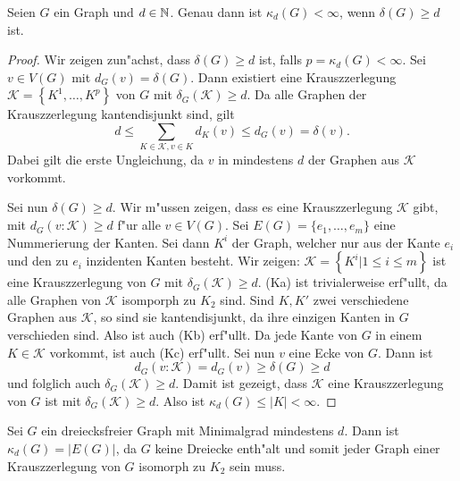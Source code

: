 \begin{lemma}
  Seien $G$ ein Graph und $d\in {\mathbb{N}}$. Genau dann ist $\kappa_{d}(G) < \infty$, wenn $\delta(G) \geq d$ ist. \label{lm:krauszexistenz}
\end{lemma}
\begin{proof}
  Wir zeigen zun"achst, dass $\delta(G) \geq d$ ist, falls $p = \kappa_d(G) < \infty$. Sei $v\in V(G)$ mit $d_{G}(v) = \delta(G)$. Dann existiert eine Krauszzerlegung $\mathcal{K}=\left\{ K^{1}, \dots , K^{p} \right\}$ von $G$ mit $\delta_{G}(\mathcal{K}) \geq d$. Da alle Graphen der Krauszzerlegung kantendisjunkt sind, gilt $$ d \leq \sum\limits_{K\in \mathcal{K}, v\in K} d_{K}(v) \leq d_{G}(v) = \delta(v).$$
  Dabei gilt die erste Ungleichung, da $v$ in mindestens $d$ der Graphen aus $\mathcal{K}$ vorkommt.

  Sei nun $\delta(G) \geq d$. Wir m"ussen zeigen, dass es eine Krauszzerlegung $\mathcal{K}$ gibt, mit
  $d_{G}(v:\mathcal{K}) \geq d$ f"ur alle $v\in V(G)$. Sei $E(G)= \{e_1,\dots, e_{m}\}$ eine Nummerierung der Kanten. Sei dann $K^i$ der Graph, welcher nur aus der Kante $e_i$ und den zu $e_i$ inzidenten Kanten besteht. Wir zeigen: $\mathcal{K} = \left\{ K^i | 1 \leq i \leq m \right\}$ ist eine Krauszzerlegung von $G$ mit $\delta_{G}(\mathcal{K}) \geq d$. (Ka) ist trivialerweise erf"ullt, da alle Graphen von $\mathcal{K}$ isomporph zu $K_{2}$ sind. Sind $K,K'$ zwei verschiedene Graphen aus $\mathcal{K}$, so sind sie
  kantendisjunkt, da ihre einzigen Kanten in $G$ verschieden sind. Also ist auch (Kb) erf"ullt. Da jede Kante von $G$ in einem $K\in \mathcal{K}$ vorkommt, ist auch (Kc) erf"ullt. Sei nun $v$ eine Ecke von $G$. Dann ist $$d_{G}(v:\mathcal{K}) = d_{G}(v) \geq \delta(G) \geq d$$ und folglich auch $\delta_{G}(\mathcal{K}) \geq d$. Damit ist gezeigt, dass $\mathcal{K}$ eine Krauszzerlegung von $G$ ist mit $\delta_{G}\left( \mathcal{K} \right) \geq d$. Also ist $\kappa_{d}(G) \leq |K| <
  \infty$.
\end{proof}

\begin{example}
  Sei $G$ ein dreiecksfreier Graph mit Minimalgrad mindestens $d$. Dann ist $\kappa_{d}(G) = |E(G)|$, da $G$ keine Dreiecke enth"alt und somit jeder Graph einer Krauszzerlegung von $G$ isomorph zu $K_{2}$ sein muss. 
\end{example}

